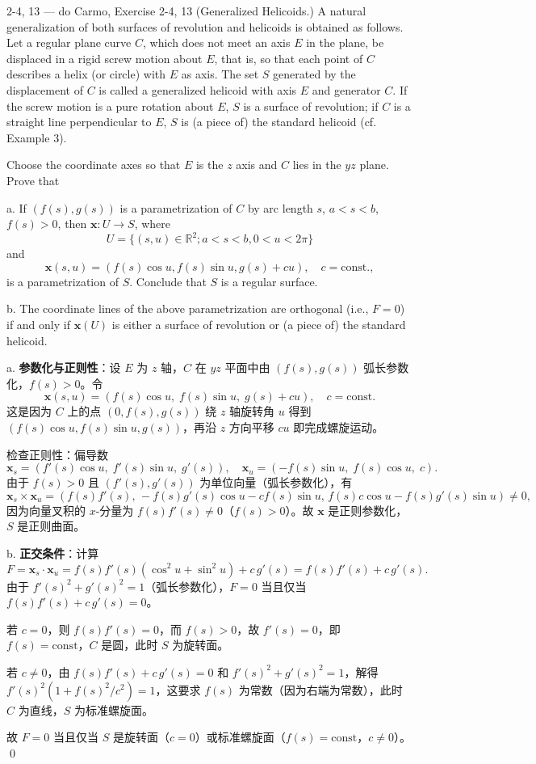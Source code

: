 \begin{exercise}{2-4, 13 — do Carmo, Exercise 2-4, 13}
(Generalized Helicoids.) A natural generalization of both surfaces of revolution and helicoids is obtained as follows. Let a regular plane curve $C$, which does not meet an axis $E$ in the plane, be displaced in a rigid screw motion about $E$, that is, so that each point of $C$ describes a helix (or circle) with $E$ as axis. The set $S$ generated by the displacement of $C$ is called a generalized helicoid with axis $E$ and generator $C$. If the screw motion is a pure rotation about $E$, $S$ is a surface of revolution; if $C$ is a straight line perpendicular to $E$, $S$ is (a piece of) the standard helicoid (cf. Example 3).

Choose the coordinate axes so that $E$ is the $z$ axis and $C$ lies in the $yz$ plane. Prove that

a. If $(f(s), g(s))$ is a parametrization of $C$ by arc length $s$, $a < s < b$, $f(s) > 0$, then $\mathbf{x}: U \to S$, where
\[
U = \{(s, u) \in \mathbb{R}^2; a < s < b, 0 < u < 2\pi\}
\]
and
\[
\mathbf{x}(s, u) = (f(s) \cos u, f(s) \sin u, g(s) + cu), \quad c = \mathrm{const.},
\]
is a parametrization of $S$. Conclude that $S$ is a regular surface.

b. The coordinate lines of the above parametrization are orthogonal (i.e., $F = 0$) if and only if $\mathbf{x}(U)$ is either a surface of revolution or (a piece of) the standard helicoid.
\end{exercise}

\begin{solution}
a. \textbf{参数化与正则性}：设 $E$ 为 $z$ 轴，$C$ 在 $yz$ 平面中由 $(f(s), g(s))$ 弧长参数化，$f(s) > 0$。令
\[
\mathbf{x}(s, u) = (f(s)\cos u,\; f(s)\sin u,\; g(s) + cu),\quad c = \mathrm{const.}
\]
这是因为 $C$ 上的点 $(0, f(s), g(s))$ 绕 $z$ 轴旋转角 $u$ 得到 $(f(s)\cos u, f(s)\sin u, g(s))$，再沿 $z$ 方向平移 $cu$ 即完成螺旋运动。

检查正则性：偏导数
\[
\mathbf{x}_s = (f'(s)\cos u,\; f'(s)\sin u,\; g'(s)),\quad
\mathbf{x}_u = (-f(s)\sin u,\; f(s)\cos u,\; c).
\]
由于 $f(s) > 0$ 且 $(f'(s), g'(s))$ 为单位向量（弧长参数化），有
\[
\mathbf{x}_s \times \mathbf{x}_u = (f(s)f'(s),\, -f(s)g'(s)\cos u - c f(s)\sin u,\, f(s)c\cos u - f(s)g'(s)\sin u) \neq 0,
\]
因为向量叉积的 $x$-分量为 $f(s)f'(s) \neq 0$（$f(s) > 0$）。故 $\mathbf{x}$ 是正则参数化，$S$ 是正则曲面。

b. \textbf{正交条件}：计算
\[
F = \mathbf{x}_s \cdot \mathbf{x}_u = f(s)f'(s)(\cos^2 u + \sin^2 u) + c\, g'(s) = f(s)f'(s) + c\, g'(s).
\]
由于 $f'(s)^2 + g'(s)^2 = 1$（弧长参数化），$F = 0$ 当且仅当 $f(s)f'(s) + c\, g'(s) = 0$。

若 $c = 0$，则 $f(s)f'(s) = 0$，而 $f(s) > 0$，故 $f'(s) = 0$，即 $f(s) = \mathrm{const}$，$C$ 是圆，此时 $S$ 为旋转面。

若 $c \neq 0$，由 $f(s)f'(s) + c\, g'(s) = 0$ 和 $f'(s)^2 + g'(s)^2 = 1$，解得 $f'(s)^2(1 + f(s)^2/c^2) = 1$，这要求 $f(s)$ 为常数（因为右端为常数），此时 $C$ 为直线，$S$ 为标准螺旋面。

故 $F = 0$ 当且仅当 $S$ 是旋转面（$c = 0$）或标准螺旋面（$f(s) = \mathrm{const}$，$c \neq 0$）。
\qed
\end{solution}

